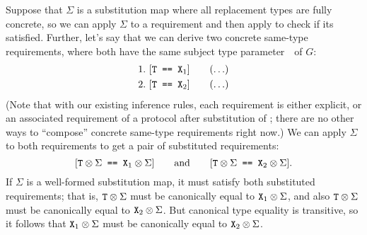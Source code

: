 \documentclass[../generics]{subfiles}
\begin{document}
Suppose that $\Sigma$ is a substitution map where all replacement types are fully concrete, so we can apply $\Sigma$ to a requirement and then apply  to check if its satisfied. Further, let's say that we can derive two concrete same-type requirements, where both have the same subject type parameter~\tT\ of $G$:
\begin{gather*}
\AnyStep{\SameReq{T}{$\tX_1$}}{1}\\
\AnyStep{\SameReq{T}{$\tX_2$}}{2}
\end{gather*}
(Note that with our existing inference rules, each requirement is either explicit, or an associated requirement of a protocol after substitution of \tSelf; there are no other ways to ``compose'' concrete same-type requirements right now.) We can apply $\Sigma$ to both requirements to get a pair of substituted requirements:
\[ [\texttt{$\texttt{T}\otimes\Sigma$ == $\texttt{X}_1\otimes\Sigma$}]\qquad\text{and}\qquad
   [\texttt{$\texttt{T}\otimes\Sigma$ == $\texttt{X}_2\otimes\Sigma$}]. \]
If $\Sigma$ is a well-formed substitution map, it must satisfy both substituted requirements; that is, $\texttt{T}\otimes\Sigma$ must be canonically equal to $\texttt{X}_1\otimes\Sigma$, and also $\texttt{T}\otimes\Sigma$ must be canonically equal to $\texttt{X}_2\otimes\Sigma$. But canonical type equality is transitive, so it follows that $\texttt{X}_1\otimes\Sigma$ must be canonically equal to $\texttt{X}_2\otimes\Sigma$.
\end{document}
